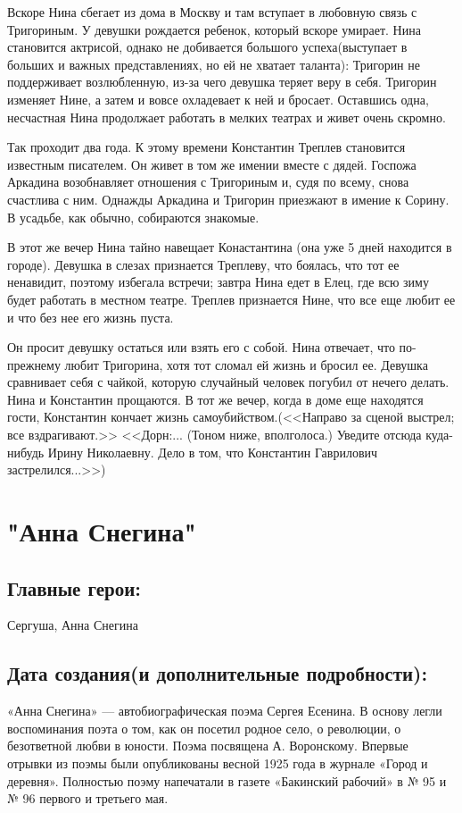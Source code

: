 \documentclass[a4paper,12pt]{article}
\begin{document}
	Вскоре Нина сбегает из дома в Москву и там вступает в любовную связь с Тригориным. У девушки рождается ребенок, который вскоре умирает. Нина становится актрисой, однако не добивается большого успеха(выступает в больших и важных представлениях, но ей не хватает таланта): Тригорин не поддерживает возлюбленную, из-за чего девушка теряет веру в себя. Тригорин изменяет Нине, а затем и вовсе охладевает к ней и бросает. Оставшись одна, несчастная Нина продолжает работать в мелких театрах и живет очень скромно.
	
	Так проходит два года. К этому времени Константин Треплев становится известным писателем. Он живет в том же имении вместе с дядей. Госпожа Аркадина возобнавляет отношения с Тригориным и, судя по всему, снова счастлива с ним. Однажды Аркадина и Тригорин приезжают в имение к Сорину. В усадьбе, как обычно, собираются знакомые.
	
	В этот же вечер Нина тайно навещает Конастантина (она уже 5 дней находится в городе). Девушка в слезах признается Треплеву, что боялась, что тот ее ненавидит, поэтому избегала встречи; завтра Нина едет в Елец, где всю зиму будет работать в местном театре. Треплев признается Нине, что все еще любит ее и что без нее его жизнь пуста.
	
	Он просит девушку остаться или взять его с собой. Нина отвечает, что по-прежнему любит Тригорина, хотя тот сломал ей жизнь и бросил ее. Девушка сравнивает себя с чайкой, которую случайный человек погубил от нечего делать. Нина и Константин прощаются. В тот же вечер, когда в доме еще находятся гости, Константин кончает жизнь самоубийством.(<<Направо за сценой выстрел; все вздрагивают.>> <<Дорн:... (Тоном ниже, вполголоса.) Уведите отсюда куда-нибудь Ирину Николаевну. Дело в том, что Константин Гаврилович застрелился...>>)
	
	\section{"Анна Снегина"}
	\subsection{Главные герои: }
	Сергуша, Анна Снегина
	\subsection{Дата создания(и дополнительные подробности): }
	«Анна Снегина» — автобиографическая поэма Сергея Есенина. В основу легли воспоминания поэта о том, как он посетил родное село, о революции, о безответной любви в юности. Поэма посвящена А. Воронскому. Впервые отрывки из поэмы были опубликованы весной 1925 года в журнале «Город и деревня». Полностью поэму напечатали в газете «Бакинский рабочий» в № 95 и № 96 первого и третьего мая.
	
\end{document}
